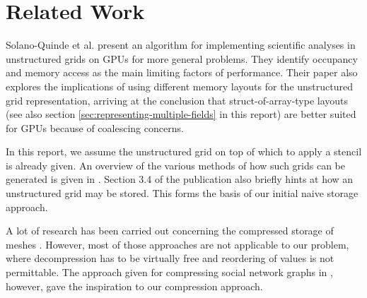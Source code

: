 \section{Related Work}

Solano-Quinde et al. \cite{solano2011} present an algorithm for implementing scientific analyses in unstructured grids on GPUs for more general problems. They identify occupancy and memory access as the main limiting factors of performance. Their paper also explores the implications of using different memory layouts for the unstructured grid representation, arriving at the conclusion that struct-of-array-type layouts (see also section \ref{sec:representing-multiple-fields} in this report) are better suited for GPUs because of coalescing concerns. 

In this report, we assume the unstructured grid on top of which to apply a stencil is already given. An overview of the various methods of how such grids  can be generated is given in \cite{mavriplis1997}. Section 3.4 of the publication also briefly hints at how an unstructured grid may be stored. This forms the basis of our initial naive storage approach.

A lot of research has been carried out concerning the compressed storage of meshes \cite{edgebreaker}\cite{edgebreaker-quadrilateral}. However, most of those approaches are not applicable to our problem, where decompression has to be virtually free and reordering of values is not permittable. The approach given for compressing social network graphs in \cite{social}, however, gave the inspiration to our compression approach.